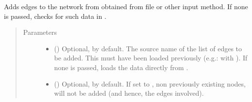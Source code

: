 \documentclass[letterpaper,10pt,english]{sphinxmanual}
\begin{document}
\begin{fulllineitems}
\begin{fulllineitems}
\begin{quote}
\begin{description}
\end{description}\end{quote}

\end{fulllineitems}


\begin{fulllineitems}
\label{\detokenize{reference:pypath.main.PyPath.attach_network}}
Adds edges to the network from  obtained from file or
other input method. If none is passed, checks for such data in
.
\begin{quote}\begin{description}
\item[{Parameters}] \leavevmode\begin{itemize}
\item {} 
 () \textendash{} Optional,  by default. The source name of the list
of edges to be added. This must have been loaded previously
(e.g.: with {\hyperref[\detokenize{reference:pypath.main.PyPath.read_data_file}]{}}).
If none is passed, loads the data directly from
.

\item {} 
 () \textendash{} Optional,  by default. If set to , non
previously existing nodes, will not be added (and hence, the
edges involved).

\end{itemize}

\end{description}\end{quote}

\end{fulllineitems}



\end{fulllineitems}
\end{document}
